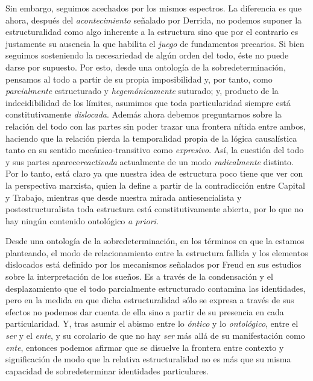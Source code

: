 Sin embargo, seguimos acechados por los mismos espectros. La diferencia es que ahora, después del \emph{acontecimiento} señalado por Derrida, no podemos suponer la estructuralidad como algo inherente a la estructura sino que por el contrario es justamente su ausencia la que habilita el \emph{juego} de fundamentos precarios. Si bien seguimos sosteniendo la necesariedad de algún orden del todo, éste no puede darse por supuesto. Por esto, desde una ontología de la sobredeterminación, pensamos al todo a partir de su propia imposibilidad y, por tanto, como \emph{parcialmente} estructurado y \emph{hegemónicamente} suturado; y, producto de la indecidibilidad de los límites, asumimos que toda particularidad siempre está constitutivamente \emph{dislocada}. Además ahora debemos preguntarnos sobre la relación del todo con las partes sin poder trazar una frontera nítida entre ambos, haciendo que la relación pierda la temporalidad propia de la lógica causalística tanto en su sentido mecánico-transitivo como \emph{expresivo}. Así, la cuestión del todo y sus partes aparece\emph{reactivada} actualmente de un modo \emph{radicalmente} distinto. Por lo tanto, está claro ya que nuestra idea de estructura poco tiene que ver con la perspectiva marxista, quien la define a partir de la contradicción entre Capital y Trabajo, mientras que desde nuestra mirada antiesencialista y postestructuralista toda estructura está constitutivamente abierta, por lo que no hay ningún contenido ontológico \emph{a priori}.

Desde una ontología de la sobredeterminación, en los términos en que la estamos planteando, el modo de relacionamiento entre la estructura fallida y los elementos dislocados está definido por los mecanismos señalados por Freud en sus estudios sobre la interpretación de los sueños. Es a través de la condensación y el desplazamiento que el todo parcialmente estructurado contamina las identidades, pero en la medida en que dicha estructuralidad sólo se expresa a través de sus efectos no podemos dar cuenta de ella sino a partir de su presencia en cada particularidad. Y, tras asumir el abismo entre lo \emph{óntico} y lo \emph{ontológico}, entre el \emph{ser} y el \emph{ente}, y su corolario de que no hay \emph{ser} más allá de su manifestación como \emph{ente}, entonces podemos afirmar que se disuelve la frontera entre contexto y significación de modo que la relativa estructuralidad no es más que su misma capacidad de sobredeterminar identidades particulares.

